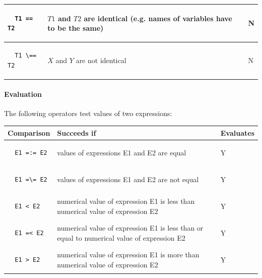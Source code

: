 \documentclass{article}
\begin{document}
\begin{multicols}{2}
\begin{tabular}{ | p{2cm} | p{4cm} | p{1.4cm} | }
  \begin{lstlisting}
  T1 == T2
  \end{lstlisting} & $T1$ and $T2$ are identical (e.g. names of variables have to be the same)& N \\
  \hline
  
  \begin{lstlisting}
  T1 \== T2
  \end{lstlisting} & $X$ and $Y$ are not identical & N \\
  \hline
  \end{tabular}
  
  \paragraph{Evaluation} The following operators test values of two expressions:
  
  \noindent \begin{tabular}{ | p{2cm} | p{4cm} | p{1.4cm} | }
  \hline
  \bf Comparison & \bf Succeeds if & \bf Evaluates \\
  \hline
  
  
  \begin{lstlisting}
  E1 =:= E2
  \end{lstlisting} & values of expressions E1 and E2 are equal & Y \\
  \hline
  
  \begin{lstlisting}
  E1 =\= E2
  \end{lstlisting} & values of expressions E1 and E2 are not equal & Y \\
  \hline
  
  \begin{lstlisting}
  E1 < E2
  \end{lstlisting} & numerical value of expression E1 is less than numerical value of expression E2 & Y \\
  \hline
  
  \begin{lstlisting}
  E1 =< E2
  \end{lstlisting} & numerical value of expression E1 is less than or equal to numerical value of expression E2 & Y \\
  \hline
  
  \begin{lstlisting}
  E1 > E2
  \end{lstlisting} & numerical value of expression E1 is more than numerical value of expression E2 & Y \\
  \hline
  

\end{tabular}
\end{multicols}
\end{document}
